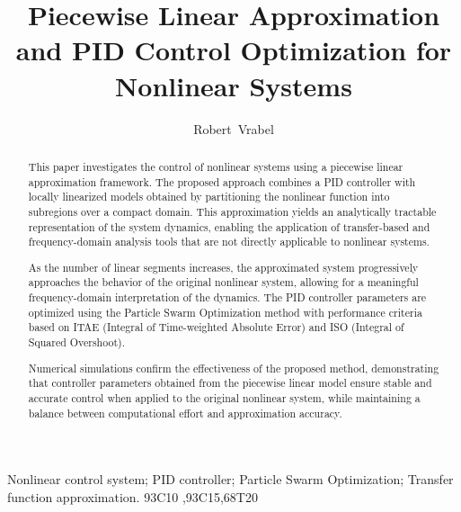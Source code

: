 \documentclass[preprint,12pt]{elsarticle}
\begin{document}
\title{Piecewise Linear Approximation and PID Control Optimization for Nonlinear Systems}
\author{Robert~Vrabel}
\address{Slovak University of Technology in Bratislava, Institute of Applied Informatics, Automation and Mechatronics,  Bottova 25,  917 24 Trnava, Slovakia\\ (ORCID: 0000-0002-2640-595X)}

  
\begin{abstract}
	This paper investigates the control of nonlinear systems using a piecewise linear approximation framework. The proposed approach combines a PID controller with locally linearized models obtained by partitioning the nonlinear function into subregions over a compact domain. This approximation yields an analytically tractable representation of the system dynamics, enabling the application of transfer-based and frequency-domain analysis tools that are not directly applicable to nonlinear systems. 
	
	As the number of linear segments increases, the approximated system progressively approaches the behavior of the original nonlinear system, allowing for a meaningful frequency-domain interpretation of the dynamics. The PID controller parameters are optimized using the Particle Swarm Optimization method with performance criteria based on ITAE (Integral of Time-weighted Absolute Error) and ISO (Integral of Squared Overshoot). 
	
	Numerical simulations confirm the effectiveness of the proposed method, demonstrating that controller parameters obtained from the piecewise linear model ensure stable and accurate control when applied to the original nonlinear system, while maintaining a balance between computational effort and approximation accuracy.
\end{abstract}

\begin{keyword}                             
Nonlinear control system; PID controller; Particle Swarm Optimization; Transfer function approximation.
\MSC  93C10 \sep 93C15\sep 68T20                
\end{keyword}                              
              
\newtheorem{thm}{Theorem} 
\newtheorem{lem}[thm]{Lemma}
\newtheorem{defn}[thm]{Definition}

\maketitle
\end{document}
